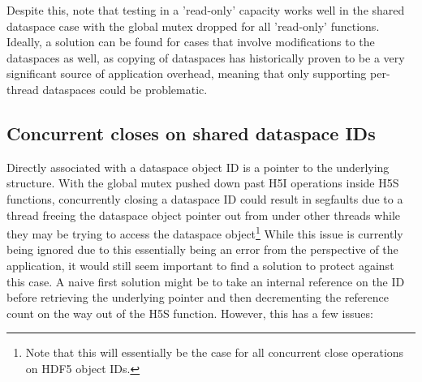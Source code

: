 \documentclass[../HDF5_RFC.tex]{subfiles}
\begin{document}
Despite this, note that testing in a 'read-only' capacity works well in the shared dataspace case with the global mutex dropped for all 'read-only' functions. Ideally, a solution can be found for cases that involve
modifications to the dataspaces as well, as copying of dataspaces has historically proven to be a very
significant source of application overhead, meaning that only supporting per-thread dataspaces could be
problematic.

\subsection{Concurrent closes on shared dataspace IDs}

Directly associated with a dataspace object ID is a pointer to the underlying 
structure. With the global mutex pushed down past H5I operations inside H5S functions, concurrently closing a
dataspace ID could result in segfaults due to a thread freeing the dataspace object pointer out from under
other threads while they may be trying to access the dataspace object\footnote{Note that this will essentially
be the case for all concurrent close operations on HDF5 object IDs.} While this issue is currently being
ignored due to this essentially being an error from the perspective of the application, it would still seem
important to find a solution to protect against this case. A naive first solution might be to take an
internal reference on the ID before retrieving the underlying pointer and then decrementing the reference
count on the way out of the H5S function. However, this has a few issues:
\end{document}
